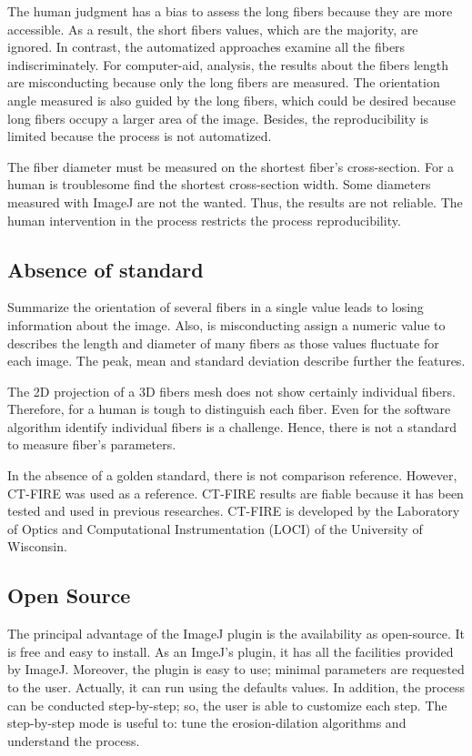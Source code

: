 \documentclass[12pt,a4paper]{article}
\begin{document}
The human judgment has a bias to assess the long fibers because they are more accessible. As a result, the short fibers values, which are the majority, are ignored. In contrast, the automatized approaches examine all the fibers indiscriminately. For computer-aid, analysis, the results about the fibers length are misconducting because only the long fibers are measured. The orientation angle measured is also guided by the long fibers, which could be desired because long fibers occupy a larger area of the image.  Besides, the reproducibility is limited because the process is not automatized.   

The fiber diameter must be measured on the shortest fiber's cross-section. For a human is troublesome find the shortest cross-section width. Some diameters measured with ImageJ are not the wanted. Thus, the results are not reliable. The human intervention in the process restricts the process reproducibility.  

\subsection{Absence of standard}

Summarize the orientation of several fibers in a single value leads to losing information about the image. Also, is misconducting assign a numeric value to describes the length and diameter of many fibers as those values fluctuate for each image. The peak, mean and standard deviation describe further the features.

The 2D projection of a 3D fibers mesh does not show certainly individual fibers. Therefore, for a human is tough to distinguish each fiber.  Even for the software algorithm identify individual fibers is a challenge. Hence, there is not a standard to measure fiber's parameters.

In the absence of a golden standard, there is not comparison reference. However, CT-FIRE was used as a reference. CT-FIRE results are fiable because it has been tested and used in previous researches. CT-FIRE is developed by the Laboratory of Optics and Computational Instrumentation (LOCI) of the University of Wisconsin. 
\subsection{Open Source}
The principal advantage of the ImageJ plugin is the availability as open-source.  It is free and easy to install. As an ImgeJ's plugin, it has all the facilities provided by ImageJ. Moreover, the plugin is easy to use; minimal parameters are requested to the user. Actually, it can run using the defaults values. In addition, the process can be conducted step-by-step; so, the user is able to customize each step. The step-by-step mode is useful to: tune the erosion-dilation algorithms and understand the process. 
\end{document}

